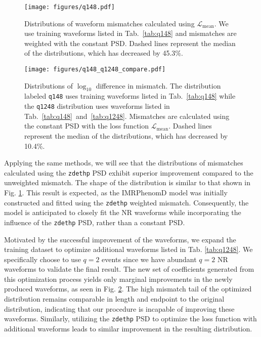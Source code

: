 \documentclass[twocolumn]{aastex631}
\newcommand{\zdethp}{\texttt{zdethp}}
\newcommand{\kw}[1]{{\color{rb4}[KW: #1 ]}}
\begin{document}
\begin{figure}[t]
	\centering
	\texttt{[image: figures/q148.pdf]}
	\caption{Distributions of waveform mismatches calculated using 
	$\mathcal{L}_{\mathrm{mean}}$. We use training waveforms listed in 
	Tab.~\ref{tab:q148} and	mismatches are weighted with the constant PSD. 
	Dashed lines represent the median of the distributions, which has decreased by 45.3\%.}
	\label{fig:q148}
\end{figure}
\begin{figure}[t]
	\centering
	\texttt{[image: figures/q148\_q1248\_compare.pdf]}
	\caption{Distributions of $\log_{10}$ difference in mismatch. The
	distribution labeled \texttt{q148} uses training waveforms listed in
	Tab.~\ref{tab:q148} while the \texttt{q1248} distribution uses waveforms
	listed in Tab.~\ref{tab:q148}~and~\ref{tab:q1248}. Mismatches are calculated
	using the constant PSD with the loss function $\mathcal{L}_{\mathrm{mean}}$. 
	Dashed lines represent the median of the distributions, which has decreased by 10.4\%.}
	\label{fig:q148_q1248_compare}
\end{figure}

Applying the same methods, we will see that the distributions of mismatches
calculated using the {\zdethp} PSD exhibit superior improvement compared to the 
unweighted mismatch.
The shape of the distribution is similar to that shown in Fig. \ref{fig:q148}.
This result is expected, as the IMRPhenomD model was initially constructed and
fitted using the {\zdethp} weighted mismatch. Consequently, the model is
anticipated to closely fit the NR waveforms while incorporating the influence of
the {\zdethp} PSD, rather than a constant PSD.

Motivated by the successful improvement of the waveforms, we expand the training
dataset to optimize additional waveforms listed in Tab. \ref{tab:q1248}. We 
specifically choose to use $q=2$ events since we have abundant $q=2$ NR waveforms 
to validate the final result. The new set of coefficients generated from this
optimization process yields only marginal improvements in the newly produced
waveforms, as seen in Fig. \ref{fig:q148_q1248_compare}. The high mismatch tail
of the optimized distribution remains comparable in length and endpoint to the
original distribution, indicating that our procedure is incapable of improving
these waveforms. Similarly, utilizing the {\zdethp} PSD to optimize the loss
function with additional waveforms leads to similar improvement in the resulting
distribution.
\end{document}
